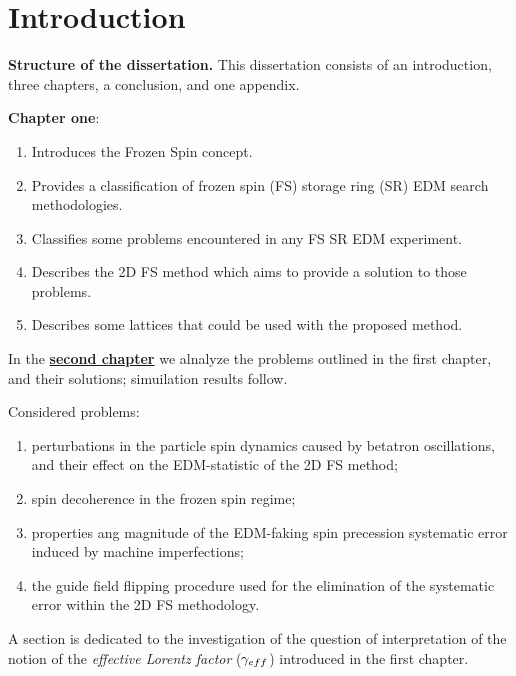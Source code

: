 \chapter*{Introduction}                         %


\textbf{Structure of the dissertation.} This dissertation consists of an introduction, three chapters,
a conclusion, and one appendix.

\textbf{Chapter one}: 
\begin{enumerate}
	\item Introduces the Frozen Spin concept.
	\item Provides a classification of frozen spin (FS) storage ring (SR) EDM search methodologies.
	\item Classifies some problems encountered in any FS SR EDM experiment.
	\item Describes the 2D FS method which aims to provide a solution to those problems.
	\item Describes some lattices that could be used with the proposed method.
\end{enumerate}

In the \underline{\textbf{second chapter}} we alnalyze the problems outlined in the first chapter, and their solutions; simuilation results follow. 

Considered problems:
\begin{enumerate}
	\item perturbations in the particle spin dynamics caused by betatron oscillations, and their effect on the EDM-statistic of the 2D FS method;
	\item spin decoherence in the frozen spin regime;
	\item properties ang magnitude of the EDM-faking spin precession systematic error induced by machine imperfections;
	\item the guide field flipping procedure used for the elimination of the systematic error within the 2D FS methodology.
\end{enumerate}

A section is dedicated to the investigation of the question of interpretation of the notion of the \emph{effective Lorentz factor} ($\gamma_{eff}$) introduced in the first chapter. 

